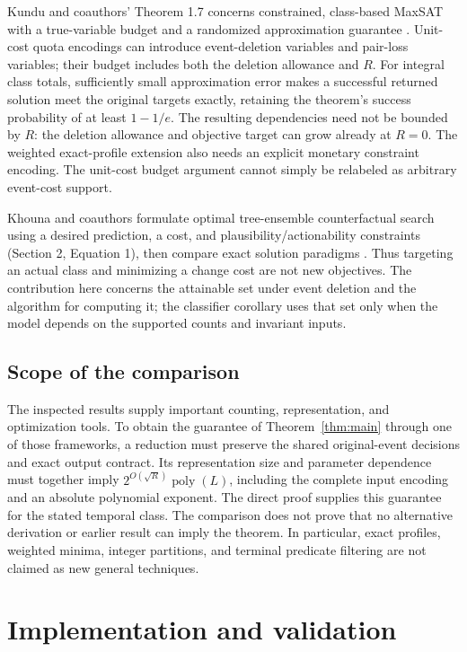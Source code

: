 \documentclass[11pt]{article}
\theoremstyle{remark}
\newcommand{\poly}{\operatorname{poly}}
\begin{document}
Kundu and coauthors' Theorem 1.7 concerns constrained, class-based MaxSAT with a true-variable
budget and a randomized approximation guarantee \citep{kundu2026}. Unit-cost
quota encodings can introduce event-deletion variables and pair-loss variables;
their budget includes both the deletion allowance and $R$. For integral
class totals, sufficiently small approximation error makes a successful
returned solution meet the original targets exactly, retaining the theorem's
success probability of at least $1-1/e$. The resulting dependencies need not
be bounded by $R$: the deletion allowance and objective target can grow already
at $R=0$. The weighted exact-profile extension also needs an explicit monetary
constraint encoding. The unit-cost budget argument cannot simply be relabeled
as arbitrary event-cost support.

Khouna and coauthors formulate optimal tree-ensemble counterfactual search
using a desired prediction, a cost, and plausibility/actionability constraints
(Section 2, Equation 1), then compare exact solution paradigms
\citep{khouna2026}. Thus targeting an actual class and minimizing a change cost
are not new objectives. The contribution here concerns the attainable set under event deletion
and the algorithm for computing it; the classifier corollary uses that set
only when the model depends on the supported counts and invariant inputs.


\subsection{Scope of the comparison}

The inspected results supply important counting, representation, and
optimization tools. To obtain the guarantee of Theorem~\ref{thm:main} through
one of those frameworks, a reduction must preserve the shared original-event
decisions and exact output contract. Its representation size and parameter
dependence must together imply $2^{O(\sqrt R)}\poly(L)$, including the complete
input encoding and an absolute polynomial exponent. The direct proof supplies
this guarantee for the stated temporal class. The comparison does not prove
that no alternative derivation or earlier
result can imply the theorem. In particular, exact profiles, weighted minima,
integer partitions, and terminal predicate filtering are not claimed as new
general techniques.

\section{Implementation and validation}\label{sec:validation}


\end{document}
